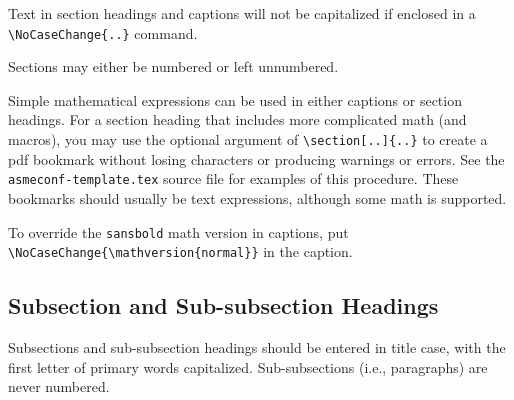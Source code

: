 \documentclass[grid,balance,upint,subscriptcorrection,varvw,mathalfa=cal=euler,spanish,french,greek,russian,vietnamese,colorlinks]{asmeconf}
\begin{document}
Text in section headings and captions will not be capitalized if enclosed in a \verb|\NoCaseChange{..}| command.

Sections may either be numbered or left unnumbered.

Simple mathematical expressions can be used in either captions or section headings. For a section heading that includes more complicated math (and macros), you may use the optional argument of \verb|\section[..]{..}| to create a pdf bookmark without losing characters or producing warnings or errors. See the \texttt{asmeconf-template.tex} source file for examples of this procedure. These bookmarks should usually be text expressions, although some math is supported.  

To override the \texttt{sansbold} math version in captions, put \verb|\NoCaseChange{\mathversion{normal}}| in the caption.

\subsection{Subsection and Sub-subsection Headings}

Subsections and sub-subsection headings should be entered in title case, with the first letter of primary words capitalized. Sub-subsections (i.e., paragraphs) are never numbered.




\begin{table}[t]
\caption[Table]{A simple table\label{tab:1}}
\end{table}


\end{document}
